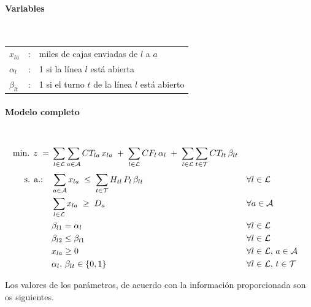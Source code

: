 \paragraph{Variables}\mbox{}\\
\begin{tabular}{lcl}
$x_{la}$ & : & miles de cajas enviadas de $l$ a $a$\\
$\alpha_l$ & : & 1 si la línea $l$ está abierta\\
$\beta_{lt}$ & : & 1 si el turno $t$ de la línea $l$ está abierto\\
\end{tabular}

\paragraph{Modelo completo}\mbox{}\\
\begin{align}
\mbox{min. } z \;=\;& \sum_{l\in\mathcal{L}}\sum_{a\in\mathcal{A}} CT_{la}\,x_{la} \;+\; \sum_{l\in\mathcal{L}} CF_l\,\alpha_l \;+\; \sum_{l\in\mathcal{L}}\sum_{t\in\mathcal{T}} CT_{lt}\,\beta_{lt} \notag\\[1mm]
\mbox{s. a.:}\quad
& \sum_{a\in\mathcal{A}} x_{la} \;\le\; \sum_{t\in\mathcal{T}} H_{tl}\,P_l\,\beta_{lt} && \forall l\in\mathcal{L} \notag\\
& \sum_{l\in\mathcal{L}} x_{la} \;\ge\; D_a && \forall a\in\mathcal{A} \notag\\
& \beta_{l1} = \alpha_l && \forall l\in\mathcal{L} \notag\\
& \beta_{l2} \le \beta_{l1} && \forall l\in\mathcal{L} \notag\\
& x_{la}\ge 0 && \forall l\in\mathcal{L},\,a\in\mathcal{A} \notag\\
& \alpha_l,\,\beta_{lt}\in\{0,1\} && \forall l\in\mathcal{L},\,t\in\mathcal{T} \notag
\end{align}

Los valores de los parámetros, de acuerdo con la información proporcionada son os siguientes.

